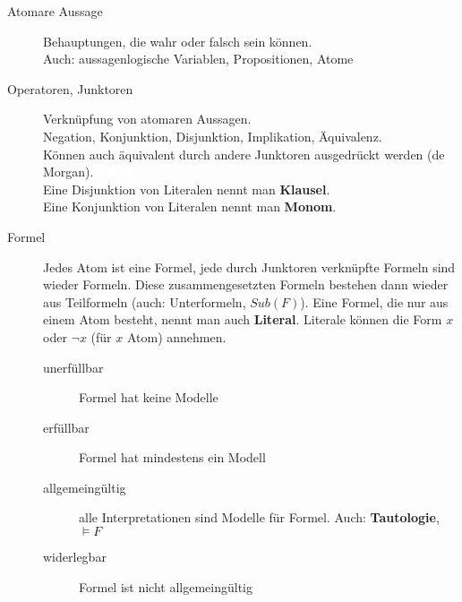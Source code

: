\documentclass[a4paper,10pt]{article}
\newcommand{\vl}[1]{\colorbox{vl}{\textcolor{white}{\small\textbf{#1}}}}
\newcommand{\f}[1]{\textbf{#1}}
\begin{document}
        \begin{description}
            \item[Atomare Aussage] Behauptungen, die wahr oder falsch sein können. \\ Auch: aussagenlogische Variablen, Propositionen, Atome
            \item[Operatoren, Junktoren] Verknüpfung von atomaren Aussagen. \\ Negation, Konjunktion, Disjunktion, Implikation, Äquivalenz. \\
                Können auch äquivalent durch andere Junktoren ausgedrückt werden (de Morgan). \vl{FS 22} \\
                Eine Disjunktion von Literalen nennt man \f{Klausel}. \\
                Eine Konjunktion von Literalen nennt man \f{Monom}.

            \item[Formel] Jedes Atom ist eine Formel, jede durch Junktoren verknüpfte Formeln sind wieder Formeln.
                Diese zusammengesetzten Formeln bestehen dann wieder aus Teilformeln (auch: Unterformeln, $Sub(F)$).
                Eine Formel, die nur aus einem Atom besteht, nennt man auch \f{Literal}. Literale können die Form $x$ oder $\neg x$ (für $x$ Atom) annehmen.
                \begin{description}
                    \item[unerfüllbar] Formel hat keine Modelle
                    \item[erfüllbar] Formel hat mindestens ein Modell
                    \item[allgemeingültig] alle Interpretationen sind Modelle für Formel. Auch: \f{Tautologie}, $\models F$
                    \item[widerlegbar] Formel ist nicht allgemeingültig
                \end{description}


\end{description}
\end{document}

